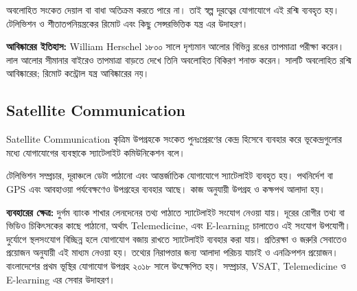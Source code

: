 অবলোহিত সংকেত দেয়াল বা বাধা অতিক্রম করতে পারে না। তাই স্বল্প দূরত্বের যোগাযোগে এই রশ্মি ব্যবহৃত হয়। টেলিভিশন ও শীতাতপনিয়ন্ত্রকের রিমোট এবং কিছু সেন্সরভিত্তিক যন্ত্র এর উদাহরণ।

\textbf{আবিষ্কারের ইতিহাস:} William Herschel ১৮০০ সালে দৃশ্যমান আলোর বিভিন্ন রঙের তাপমাত্রা পরীক্ষা করেন। লাল আলোর সীমানার বাইরেও তাপমাত্রা বাড়তে দেখে তিনি অবলোহিত বিকিরণ শনাক্ত করেন। সালটি অবলোহিত রশ্মি আবিষ্কারের; রিমোট কন্ট্রোল যন্ত্র আবিষ্কারের নয়।




\subsection{Satellite Communication}
\begin{definitionbox}{Satellite Communication}
কৃত্রিম উপগ্রহকে সংকেত পুনঃপ্রেরণের কেন্দ্র হিসেবে ব্যবহার করে ভূকেন্দ্রগুলোর মধ্যে যোগাযোগের ব্যবস্থাকে স্যাটেলাইট কমিউনিকেশন বলে।
\end{definitionbox}
টেলিভিশন সম্প্রচার, দূরাঞ্চলে ডেটা পাঠানো এবং আন্তর্জাতিক যোগাযোগে স্যাটেলাইট ব্যবহৃত হয়। পথনির্দেশ বা GPS এবং আবহাওয়া পর্যবেক্ষণেও উপগ্রহের ব্যবহার আছে। কাজ অনুযায়ী উপগ্রহ ও কক্ষপথ আলাদা হয়।

\textbf{ব্যবহারের ক্ষেত্র:} দুর্গম ব্যাংক শাখার লেনদেনের তথ্য পাঠাতে স্যাটেলাইট সংযোগ নেওয়া যায়। দূরের রোগীর তথ্য বা ভিডিও চিকিৎসকের কাছে পাঠানো, অর্থাৎ Telemedicine, এবং E-learning চালাতেও এই সংযোগ উপযোগী। দুর্যোগে স্থলসংযোগ বিচ্ছিন্ন হলে যোগাযোগ বজায় রাখতে স্যাটেলাইট ব্যবহার করা যায়। প্রতিরক্ষা ও জরুরি সেবাতেও প্রয়োজন অনুযায়ী এই মাধ্যম নেওয়া হয়। তথ্যের নিরাপত্তার জন্য আলাদা পরিচয় যাচাই ও এনক্রিপশন প্রয়োজন। বাংলাদেশের প্রথম ভূস্থির যোগাযোগ উপগ্রহ ২০১৮ সালে উৎক্ষেপিত হয়। সম্প্রচার, VSAT, Telemedicine ও E-learning এর সেবার উদাহরণ।

